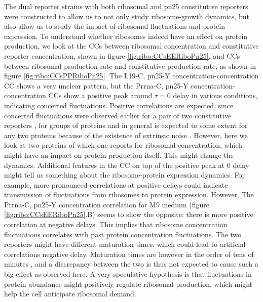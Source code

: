 The dual reporter strains with both ribosomal and pn25 constitutive reporters were constructed to allow us to not only study ribosome-growth dynamics, but also allow us to study the impact of ribosomal fluctuations and protein expression.
%
To understand whether ribosomes indeed have an effect on protein production, we look at the CCs between ribosomal concentration and constitutive reporter concentration, shown in figure \ref{fig:ribo:CCsEERiboPn25}, and CCs between ribosomal production rate and constitutive production rate, as shown in figure \ref{fig:ribo:CCsPPRiboPn25}.
%
The L19-C, pn25-Y concentration-concentration CC shows a very unclear pattern, 
but the Prrna-C, pn25-Y concentration-concentration CCs show a positive peak around $\tau = 0$ delay in various conditions, indicating concerted fluctuations.
%
Positive correlations are expected, since concerted fluctuations were observed earlier for a pair of two constitutive reporters \cite{Elowitz2002}, for groups of proteins \cite{Stewart-Ornstein2012} and in general is expected to some extent for any two proteins because of the existence of extrinsic noise \cite{Chalancon2012}.
%
However, here we look at two proteins of which one reports for ribosomal concentration, which might have an impact on protein production itself.
This might change the dynamics.
%
Additional features in the CC on top of the positive peak at 0 delay might tell us something about the ribosome-protein expression dynamics.
For example, more pronounced correlations at positive delays could indicate transmission of fluctuations from ribosomes to protein expression.
%
However, The Prrna-C, pn25-Y concentration correlation for M9 medium (figure \ref{fig:ribo:CCsEERiboPn25}.B) seems to show the opposite: there is more positive correlation at negative delays.
This implies that ribosome concentration fluctuations correlates with past protein concentration fluctuations.
%
The two reporters might have different maturation times, which could lead to artificial correlations negative delay.
%
Maturation times are however in the order of tens of minutes \cite{Iizuka2011, Walker2016t}, and a discrepancy between the two is thus not expected to cause such a big effect as observed here.
%
A very speculative hypothesis is that 
fluctuations in protein abundance might positively regulate ribosomal production,
which might help the cell anticipate ribosomal demand.%

